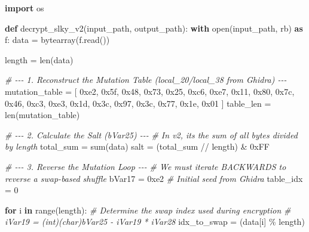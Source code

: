 \documentclass[
]{article}
\newenvironment{Shaded}{}{}
\newcommand{\BaseNTok}[1]{\textcolor[rgb]{0.25,0.63,0.44}{#1}}
\newcommand{\BuiltInTok}[1]{\textcolor[rgb]{0.00,0.50,0.00}{#1}}
\newcommand{\CommentTok}[1]{\textcolor[rgb]{0.38,0.63,0.69}{\textit{#1}}}
\newcommand{\ControlFlowTok}[1]{\textcolor[rgb]{0.00,0.44,0.13}{\textbf{#1}}}
\newcommand{\DecValTok}[1]{\textcolor[rgb]{0.25,0.63,0.44}{#1}}
\newcommand{\ImportTok}[1]{\textcolor[rgb]{0.00,0.50,0.00}{\textbf{#1}}}
\newcommand{\KeywordTok}[1]{\textcolor[rgb]{0.00,0.44,0.13}{\textbf{#1}}}
\newcommand{\NormalTok}[1]{#1}
\newcommand{\OperatorTok}[1]{\textcolor[rgb]{0.40,0.40,0.40}{#1}}
\newcommand{\StringTok}[1]{\textcolor[rgb]{0.25,0.44,0.63}{#1}}
\begin{document}
\begin{Shaded}
\begin{Highlighting}[]
\ImportTok{import}\NormalTok{ os}

\KeywordTok{def}\NormalTok{ decrypt\_slky\_v2(input\_path, output\_path):}
    \ControlFlowTok{with} \BuiltInTok{open}\NormalTok{(input\_path, }\StringTok{\textquotesingle{}rb\textquotesingle{}}\NormalTok{) }\ImportTok{as}\NormalTok{ f:}
\NormalTok{        data }\OperatorTok{=} \BuiltInTok{bytearray}\NormalTok{(f.read())}
    
\NormalTok{    length }\OperatorTok{=} \BuiltInTok{len}\NormalTok{(data)}
    
    \CommentTok{\# {-}{-}{-} 1. Reconstruct the Mutation Table (local\_20/local\_38 from Ghidra) {-}{-}{-}}
\NormalTok{    mutation\_table }\OperatorTok{=}\NormalTok{ [}
        \BaseNTok{0xe2}\NormalTok{, }\BaseNTok{0x5f}\NormalTok{, }\BaseNTok{0x48}\NormalTok{, }\BaseNTok{0x73}\NormalTok{, }\BaseNTok{0x25}\NormalTok{, }\BaseNTok{0xc6}\NormalTok{, }\BaseNTok{0xe7}\NormalTok{, }\BaseNTok{0x11}\NormalTok{,}
        \BaseNTok{0x80}\NormalTok{, }\BaseNTok{0x7c}\NormalTok{, }\BaseNTok{0x46}\NormalTok{, }\BaseNTok{0xc3}\NormalTok{, }\BaseNTok{0xe3}\NormalTok{, }\BaseNTok{0x1d}\NormalTok{, }\BaseNTok{0x3c}\NormalTok{, }\BaseNTok{0x97}\NormalTok{,}
        \BaseNTok{0x3c}\NormalTok{, }\BaseNTok{0x77}\NormalTok{, }\BaseNTok{0x1e}\NormalTok{, }\BaseNTok{0x01}
\NormalTok{    ]}
\NormalTok{    table\_len }\OperatorTok{=} \BuiltInTok{len}\NormalTok{(mutation\_table)}

    \CommentTok{\# {-}{-}{-} 2. Calculate the Salt (bVar25) {-}{-}{-}}
    \CommentTok{\# In v2, it\textquotesingle{}s the sum of all bytes divided by length}
\NormalTok{    total\_sum }\OperatorTok{=} \BuiltInTok{sum}\NormalTok{(data)}
\NormalTok{    salt }\OperatorTok{=}\NormalTok{ (total\_sum }\OperatorTok{//}\NormalTok{ length) }\OperatorTok{\&} \BaseNTok{0xFF}
    
    \CommentTok{\# {-}{-}{-} 3. Reverse the Mutation Loop {-}{-}{-}}
    \CommentTok{\# We must iterate BACKWARDS to reverse a swap{-}based shuffle}
\NormalTok{    bVar17 }\OperatorTok{=} \BaseNTok{0xe2} \CommentTok{\# Initial seed from Ghidra}
\NormalTok{    table\_idx }\OperatorTok{=} \DecValTok{0}
    
    \ControlFlowTok{for}\NormalTok{ i }\KeywordTok{in} \BuiltInTok{range}\NormalTok{(length):}
        \CommentTok{\# Determine the swap index used during encryption}
        \CommentTok{\# iVar19 = (int)(char)bVar25 {-} iVar19 * iVar28}
\NormalTok{        idx\_to\_swap }\OperatorTok{=}\NormalTok{ (data[i] }\OperatorTok{\%}\NormalTok{ length)}
        

\end{Highlighting}
\end{Shaded}
\end{document}
